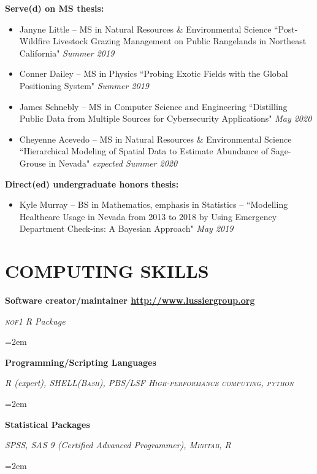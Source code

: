 \documentclass[paper=a4,fontsize=11pt]{scrartcl} %
\newcommand{\NewPart}[2]{\section*{\uppercase{#1} #2 }}
\newcommand{\EducationEntry}[4]{
		\noindent \textbf{#1} \hfill      %
		\colorbox{White}{%
			\parbox{6em}{%
			\hfill\color{Black}#2}} \par  %
		\noindent \textit{#3} \par        %
		\noindent\hangindent=2em\hangafter=0 \small #4 %
		\normalsize \par \vspace{-7pt}}
\newcommand{\ThesisEntry}[5]{
		\noindent #1 -- #2 #3 ``#4" \textit{#5}}
\begin{document}
  \noindent \textbf{Serve(d) on MS thesis:}

  \begin{itemize}[noitemsep]
    

\item \ThesisEntry{Janyne Little}{MS in Natural Resources \& Environmental Science}{}{Post-Wildfire Livestock Grazing Management on Public Rangelands in Northeast California}{Summer 2019}

  \item \ThesisEntry{Conner Dailey}{MS in Physics}{}{Probing Exotic Fields with the Global Positioning System}{Summer 2019}

  \item \ThesisEntry{James Schnebly}{MS in Computer Science and Engineering}{}{Distilling Public Data from Multiple Sources for Cybersecurity Applications}{May 2020}

          \item \ThesisEntry{Cheyenne Acevedo}{MS in Natural Resources \& Environmental Science}{}{Hierarchical Modeling of Spatial Data to Estimate Abundance of Sage-Grouse in Nevada}{expected Summer 2020}

  
  \end{itemize}

    \noindent \textbf{Direct(ed) undergraduate honors thesis:}

    \begin{itemize}[noitemsep]
      
    \item \ThesisEntry{Kyle Murray}{BS in Mathematics, emphasis in Statistics}{--}{Modelling Healthcare Usage in Nevada from 2013 to 2018 by Using Emergency Department Check-ins: A Bayesian Approach}{May 2019}
      

  \end{itemize}
  

\NewPart{Computing Skills}{}
\vspace{-7pt}
\EducationEntry{Software creator/maintainer \href{http://www.lussiergroup.org/publications/N-of-1-pathways}{http://www.lussiergroup.org}}{}{\textsc{nof1} R Package}{}

\EducationEntry{Programming/Scripting Languages}{}{\textsc{R }(expert), \textsc{SHELL(Bash), PBS/LSF High-performance computing, python}}{}

\EducationEntry{Statistical Packages}{}{\textsc{SPSS, SAS 9} (Certified Advanced Programmer)\textsc{, Minitab, R}}{}
\end{document}
